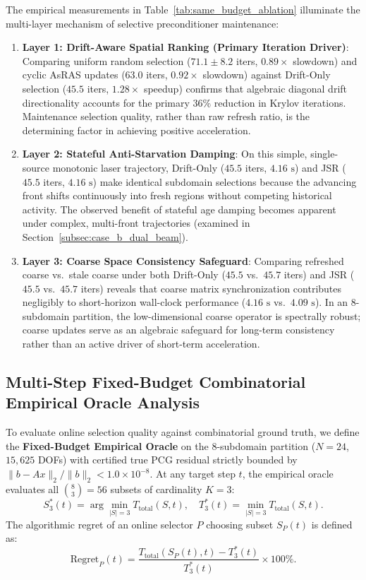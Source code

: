 \documentclass[preprint,12pt,3p]{elsarticle}
\begin{document}
The empirical measurements in Table~\ref{tab:same_budget_ablation} illuminate the multi-layer mechanism of selective preconditioner maintenance:
\begin{enumerate}
    \item \textbf{Layer 1: Drift-Aware Spatial Ranking (Primary Iteration Driver)}: Comparing uniform random selection ($71.1 \pm 8.2$ iters, $0.89\times$ slowdown) and cyclic AsRAS updates ($63.0$ iters, $0.92\times$ slowdown) against Drift-Only selection ($45.5$ iters, $1.28\times$ speedup) confirms that algebraic diagonal drift directionality accounts for the primary 36\% reduction in Krylov iterations. Maintenance selection quality, rather than raw refresh ratio, is the determining factor in achieving positive acceleration.
    \item \textbf{Layer 2: Stateful Anti-Starvation Damping}: On this simple, single-source monotonic laser trajectory, Drift-Only ($45.5$ iters, $4.16\text{ s}$) and JSR ($45.5$ iters, $4.16\text{ s}$) make identical subdomain selections because the advancing front shifts continuously into fresh regions without competing historical activity. The observed benefit of stateful age damping becomes apparent under complex, multi-front trajectories (examined in Section~\ref{subsec:case_b_dual_beam}).
    \item \textbf{Layer 3: Coarse Space Consistency Safeguard}: Comparing refreshed coarse vs.\ stale coarse under both Drift-Only ($45.5$ vs.\ $45.7$ iters) and JSR ($45.5$ vs.\ $45.7$ iters) reveals that coarse matrix synchronization contributes negligibly to short-horizon wall-clock performance ($4.16\text{ s}$ vs.\ $4.09\text{ s}$). In an 8-subdomain partition, the low-dimensional coarse operator is spectrally robust; coarse updates serve as an algebraic safeguard for long-term consistency rather than an active driver of short-term acceleration.
\end{enumerate}

\subsection{Multi-Step Fixed-Budget Combinatorial Empirical Oracle Analysis}
\label{subsec:oracle_regret}

To evaluate online selection quality against combinatorial ground truth, we define the \textbf{Fixed-Budget Empirical Oracle} on the 8-subdomain partition ($N=24$, $15,625$ DOFs) with certified true PCG residual strictly bounded by $\|b - A x\|_2 / \|b\|_2 < 1.0 \times 10^{-8}$. At any target step $t$, the empirical oracle evaluates all $\binom{8}{3} = 56$ subsets of cardinality $K=3$:
\begin{equation}
S_3^*(t) = \arg\min_{|S|=3} T_{\text{total}}(S, t), \quad T_3^*(t) = \min_{|S|=3} T_{\text{total}}(S, t).
\end{equation}
The algorithmic regret of an online selector $P$ choosing subset $S_P(t)$ is defined as:
\begin{equation}
\text{Regret}_P(t) = \frac{T_{\text{total}}(S_P(t), t) - T_3^*(t)}{T_3^*(t)} \times 100\%.
\end{equation}
\end{document}
